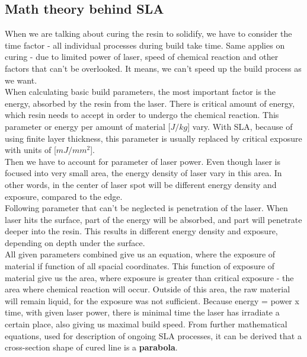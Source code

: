 \documentclass[a4paper, twoside, 11pt]{report}
\begin{document}
\subsection{Math theory behind SLA}
When we are talking about curing the resin to solidify, we have to consider the time factor - all individual processes during build take time. Same applies on curing - due to limited power of laser, speed of chemical reaction and other factors that can't be overlooked. It means, we can't speed up the build process as we want.\\
When calculating basic build parameters, the most important factor is the energy, absorbed by the resin from the laser. There is critical amount of energy, which resin needs to accept in order to undergo the chemical reaction. This parameter or energy per amount of material [$J/kg$] vary. With SLA, because of using finite layer thickness, this parameter is usually replaced by critical exposure with units of [$mJ/mm^2$].\\
Then we have to account for parameter of laser power. Even though laser is focused into very small area, the energy density of laser vary in this area. In other words, in the center of laser spot will be different energy density and exposure, compared to the edge.\\
Following parameter that can't be neglected is penetration of the laser. When laser hits the surface, part of the energy will be absorbed, and part will penetrate deeper into the resin. This results in different energy density and exposure, depending on depth under the surface.\\
All given parameters combined give us an equation, where the exposure of material if function of all spacial coordinates. This function of exposure of material give us the area, where exposure is greater than critical exposure - the area where chemical reaction will occur. Outside of this area, the raw material will remain liquid, for the exposure was not sufficient. Because energy = power x time, with given laser power, there is minimal time the laser has irradiate a certain place, also giving us maximal build speed. From further mathematical equations, used for description of ongoing SLA processes, it can be derived that a cross-section shape of cured line is a \textbf{parabola}.\\
%
\end{document}

